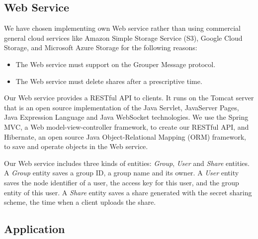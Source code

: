 \documentclass[twocolumn,10pt]{article}
\begin{document}
\subsection{Web Service}

We have chosen implementing own Web service rather than using commercial general cloud services like Amazon Simple Storage Service (S3), Google Cloud Storage, and Microsoft Azure Storage for the following reasons:

\begin{itemize}
	\setlength{\itemsep}{1pt}
	\setlength{\parskip}{0pt}
	\setlength{\parsep}{0pt}
	\item The Web service must support on the Grouper Message protocol.
	\item The Web service must delete shares after a prescriptive time.
\end{itemize}

Our Web service provides a RESTful API to clients.
It runs on the Tomcat server\cite{tomcat} that is an open source implementation of the Java Servlet, JavaServer Pages, Java Expression Language and Java WebSocket technologies. 
We use the Spring MVC\cite{spring}, a  Web model-view-controller framework, to create our RESTful API, and Hibernate\cite{hibernate}, an open source Java Object-Relational Mapping (ORM) framework, to save and operate objects in the Web service. 

Our Web service includes three kinds of entities: \emph{Group}, \emph{User} and \emph{Share} entities. 
A \emph{Group} entity saves a group ID, a group name and its owner. 
A \emph{User} entity saves the node identifier of a user, the access key for this user, and the group entity of this user. 
A \emph{Share} entity saves a share generated with the secret sharing scheme, the time when a client uploads the share. 

\subsection{Application}
\end{document}
